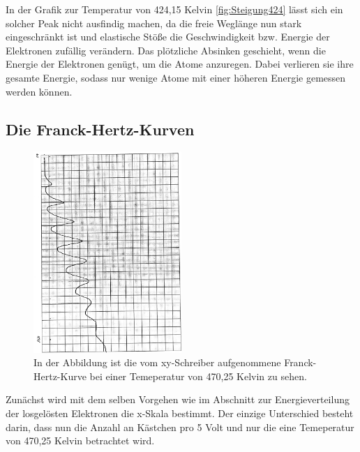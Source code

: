 \documentclass[titlepage = firstcover]{scrartcl}
\begin{document}
            \FloatBarrier

            \noindent

            In der Grafik zur Temperatur von 424,15 Kelvin \ref{fig:Steigung424} lässt sich ein solcher Peak nicht ausfindig machen, da die freie Weglänge nun stark eingeschränkt ist und elastische 
            Stöße die Geschwindigkeit bzw. Energie der Elektronen zufällig verändern. Das plötzliche Absinken geschieht, wenn die Energie der Elektronen genügt, um die Atome anzuregen. 
            Dabei verlieren sie ihre gesamte Energie, sodass nur wenige Atome mit einer höheren Energie gemessen werden können.

        \newpage
        \subsection{Die Franck-Hertz-Kurven}

            \FloatBarrier

                \begin{figure}[h]
                  \centering
                  \includegraphics[width = 0.5\textwidth, angle=90]{HertzBild.pdf}
                  \caption{In der Abbildung ist die vom xy-Schreiber aufgenommene Franck-Hertz-Kurve bei einer Temeperatur von 470,25 Kelvin zu sehen.}
                  \label{fig:Steigung300}
                \end{figure}

            \FloatBarrier

            \noindent

            Zunächst wird mit dem selben Vorgehen wie im Abschnitt zur Energieverteilung der losgelösten Elektronen die x-Skala bestimmt. Der einzige Unterschied besteht darin, dass nun die Anzahl an
            Kästchen pro 5 Volt und nur die eine Temeperatur von 470,25 Kelvin betrachtet wird.
\end{document}
